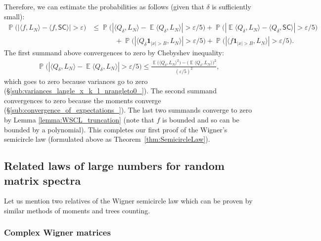 \documentclass[letterpaper,11pt,oneside,reqno]{amsart}
\numberwithin{equation}{section}
\newcommand{\SC}{\mathsf{SC}}
\DeclareMathOperator{\EE}{\mathbb{E}}
\DeclareMathOperator{\PP}{\mathbb{P}}
\theoremstyle{definition}
\begin{document}
Therefore, we can estimate the probabilities as follows
(given that $\delta$ is sufficiently small):
\begin{align*}
	\PP\Big(\left|
	\langle f,L_N\rangle-
	\langle f,\SC\rangle
	\right|
	>\varepsilon\Big)&\le
	\PP\Big(
	\left|
	\langle Q_{\delta},L_N\rangle-
	\EE\langle Q_{\delta},L_N\rangle
	\right|>\varepsilon/5
	\Big)
	+
	\PP\Big(\left|
	\EE\langle Q_{\delta},L_N\rangle-
	\langle Q_{\delta},\SC\rangle
	\right|>\varepsilon/5\Big)
	\\&\hspace{40pt}+
	\PP\Big(\left|
	\langle Q_{\delta}\mathbf{1}_{|x|> B},L_N\rangle
	\right|>\varepsilon/5\Big)
	+
	\PP\Big(
	\left|
	\langle f\mathbf{1}_{|x|> B},L_N\rangle
	\right|>\varepsilon/5\Big).
\end{align*}
The first summand above convergences to zero by Chebyshev inequality:
\begin{align*}
	\PP\Big(
	\left|
	\langle Q_{\delta},L_N\rangle-
	\EE\langle Q_{\delta},L_N\rangle
	\right|>\varepsilon/5
	\Big)\le
	\frac{\EE\big(\langle Q_{\delta},L_N\rangle^{2}\big)
	-\big(\EE\langle Q_{\delta},L_N\rangle\big)^{2}}{(\varepsilon/5)^{2}},
\end{align*}
which goes to zero because variances go to zero
(\S \ref{sub:variances_langle_x_k_l_nrangleto0_}).
The second summand convergences to zero because the moments
converge (\S \ref{sub:convergence_of_expectations_}).
The last two summands converge to zero by
Lemma \ref{lemma:WSCL_truncation} (note that $f$ is bounded and so 
can be bounded by a polynomial). 
This completes our first proof of the Wigner's semicircle law
(formulated above as Theorem~\ref{thm:SemicircleLaw}).


\subsection{Related laws of large numbers for random matrix spectra} %
\label{sub:remarks_on_the_semicircle_law_for_real_wigner_matrices}

Let us mention two relatives of the Wigner semicircle law which can be proven by similar 
methods of moments and
trees counting.

\subsubsection{Complex Wigner matrices} %
\label{ssub:complex_wigner_matrices}
	
\end{document}
